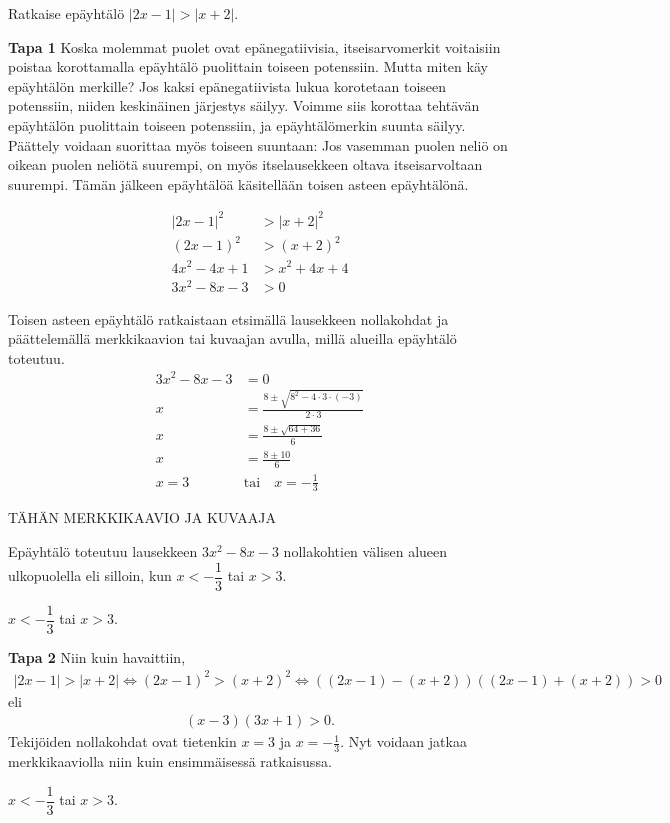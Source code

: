 \begin{esimerkki} Ratkaise epäyhtälö $|2x-1|>|x+2|$.

\begin{esimratk} \textbf{Tapa 1} Koska molemmat puolet ovat epänegatiivisia, itseisarvomerkit voitaisiin poistaa korottamalla epäyhtälö puolittain toiseen potenssiin. Mutta miten käy epäyhtälön merkille? Jos kaksi epänegatiivista lukua korotetaan toiseen potenssiin, niiden keskinäinen järjestys säilyy. Voimme siis korottaa tehtävän epäyhtälön puolittain toiseen potenssiin, ja epäyhtälömerkin suunta säilyy. Päättely voidaan suorittaa myös toiseen suuntaan: Jos vasemman puolen neliö on oikean puolen neliötä suurempi, on myös itselausekkeen oltava itseisarvoltaan suurempi. Tämän jälkeen epäyhtälöä käsitellään toisen asteen epäyhtälönä.

\begin{align*}
|2x-1|^2 & >|x+2|^2 \\
(2x-1)^2 & >(x+2)^2 \\
4x^2-4x+1 & >x^2+4x+4 \\
3x^2-8x-3 & >0
\end{align*}

Toisen asteen epäyhtälö ratkaistaan etsimällä lausekkeen nollakohdat ja päättelemällä merkkikaavion tai kuvaajan avulla, millä alueilla epäyhtälö toteutuu.
\begin{align*}
3x^2-8x-3 & =0 \\
x & =\frac{8\pm\sqrt{8^2-4\cdot3\cdot(-3)}}{2\cdot 3} \\
x & =\frac{8\pm\sqrt{64+36}}{6} \\
x & =\frac{8\pm 10}{6} \\
x=3 \quad & \text{tai} \quad x=-\frac{1}{3}
\end{align*}

TÄHÄN MERKKIKAAVIO JA KUVAAJA

Epäyhtälö toteutuu lausekkeen $3x^2-8x-3$ nollakohtien välisen alueen ulkopuolella eli silloin, kun $x<-\dfrac{1}{3}$ tai $x>3$.
\end{esimratk}

\begin{esimvast}
$x<-\dfrac{1}{3}$ tai $x>3$.
\end{esimvast}

\begin{esimratk} \textbf{Tapa 2}
Niin kuin havaittiin,
\begin{align*}
|2x-1| > |x+2| \Leftrightarrow (2x-1)^2 > (x+2)^2 \Leftrightarrow ((2x-1)-(x+2))((2x-1)+(x+2)) > 0
\end{align*}
eli
\begin{align*}
(x-3)(3x+1)>0.
\end{align*}
Tekijöiden nollakohdat ovat tietenkin $x = 3$ ja $x = -\frac{1}{3}$. Nyt voidaan jatkaa merkkikaaviolla niin kuin ensimmäisessä ratkaisussa.
\end{esimratk}
\begin{esimvast}
$x<-\dfrac{1}{3}$ tai $x>3$.
\end{esimvast}
\end{esimerkki}

